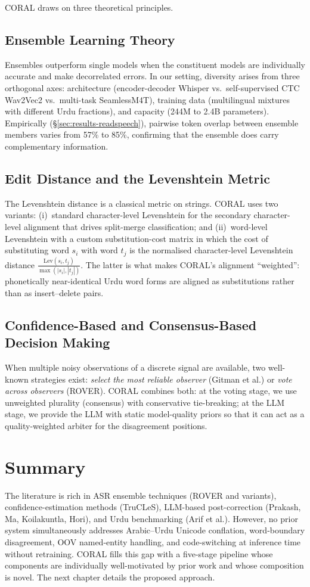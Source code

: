 CORAL draws on three theoretical principles.

\subsection{Ensemble Learning Theory}
Ensembles outperform single models when the constituent models are individually accurate and make decorrelated errors. In our setting, diversity arises from three orthogonal axes: architecture (encoder-decoder Whisper vs.\ self-supervised CTC Wav2Vec2 vs.\ multi-task SeamlessM4T), training data (multilingual mixtures with different Urdu fractions), and capacity (244M to 2.4B parameters). Empirically (\S\ref{sec:results-readspeech}), pairwise token overlap between ensemble members varies from 57\% to 85\%, confirming that the ensemble does carry complementary information.

\subsection{Edit Distance and the Levenshtein Metric}
The Levenshtein distance is a classical metric on strings. CORAL uses two variants: (i)~standard character-level Levenshtein for the secondary character-level alignment that drives split-merge classification; and (ii)~word-level Levenshtein with a custom substitution-cost matrix in which the cost of substituting word $s_i$ with word $t_j$ is the normalised character-level Levenshtein distance $\frac{\text{Lev}(s_i,t_j)}{\max(|s_i|,|t_j|)}$. The latter is what makes CORAL's alignment ``weighted'': phonetically near-identical Urdu word forms are aligned as substitutions rather than as insert--delete pairs.

\subsection{Confidence-Based and Consensus-Based Decision Making}
When multiple noisy observations of a discrete signal are available, two well-known strategies exist: \emph{select the most reliable observer} (Gitman et al.) or \emph{vote across observers} (ROVER). CORAL combines both: at the voting stage, we use unweighted plurality (consensus) with conservative tie-breaking; at the LLM stage, we provide the LLM with static model-quality priors so that it can act as a quality-weighted arbiter for the disagreement positions.

\section{Summary}
\label{sec:lit-summary}

The literature is rich in ASR ensemble techniques (ROVER and variants), confidence-estimation methods (TruCLeS), LLM-based post-correction (Prakash, Ma, Koilakuntla, Hori), and Urdu benchmarking (Arif et al.). However, no prior system simultaneously addresses Arabic--Urdu Unicode conflation, word-boundary disagreement, OOV named-entity handling, and code-switching at inference time without retraining. CORAL fills this gap with a five-stage pipeline whose components are individually well-motivated by prior work and whose composition is novel. The next chapter details the proposed approach.
